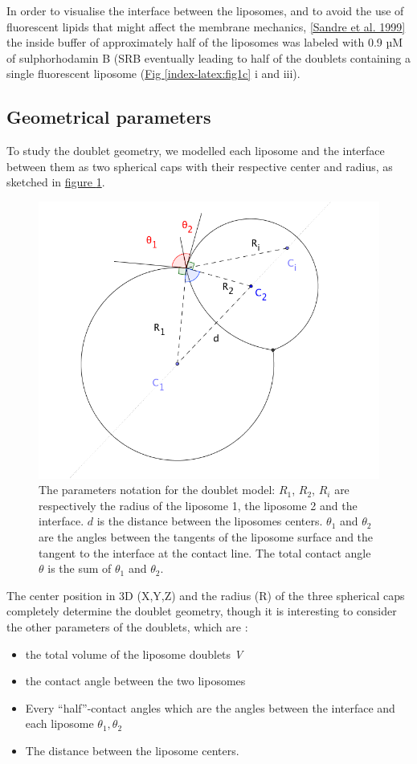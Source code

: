 \documentclass[A4paperpaper,11pt,english]{sphinxmanual}
\begin{document}
In order to visualise the interface between the liposomes, and to avoid the use of fluorescent
lipids that might affect the membrane mechanics, {\hyperref[index-latex:sandre1999]{{[}Sandre et al. 1999{]}}} the inside
buffer of approximately half of the liposomes was labeled with 0.9 µM
of sulphorhodamin B (SRB
eventually leading to half of the doublets containing a single fluorescent liposome (\hyperref[index-latex:fig1c]{Fig  \ref*{index-latex:fig1c}} i and iii).


\subsection{Geometrical parameters}
\label{index-latex:geometrical-parameters}
To study the doublet geometry, we modelled each liposome and the interface
between them as two spherical caps with their respective center and radius, as
sketched in \hyperref[index-latex:fig-notations-doublets]{figure  \ref*{index-latex:fig-notations-doublets}}.
\begin{figure}[htbp]
\centering
\capstart

\includegraphics[width=0.500\linewidth]{notations-doublets.png}
\caption{The parameters notation for the doublet model: \(R_1\), \(R_2\), \(R_i\) are respectively the
radius of the liposome 1, the liposome 2 and the interface. \(d\) is the
distance between the liposomes centers. \(\theta_1\) and \(\theta_2\) are the angles between
the tangents of the liposome surface and the tangent to the interface at the
contact line. The total contact angle \(\theta\) is the sum of \(\theta_1\) and \(\theta_2\).}\label{index-latex:fig-notations-doublets}\end{figure}

The center position in 3D (X,Y,Z) and the radius (R) of the three spherical caps
completely determine the doublet geometry, though it is interesting to consider the other
parameters of the doublets, which are :
\begin{itemize}
\item {} 
the total volume of the liposome doublets \emph{V}

\item {} 
the contact angle between the two liposomes

\item {} 
Every ``half''-contact angles which are the angles between the
interface and each liposome \(\theta_1,\theta_2\)

\item {} 
The distance between the liposome centers.

\end{itemize}
\end{document}
